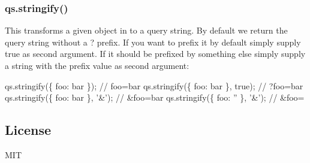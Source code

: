 \subsubsection*{qs.\+stringify()}

This transforms a given object in to a query string. By default we return the query string without a {\ttfamily ?} prefix. If you want to prefix it by default simply supply {\ttfamily true} as second argument. If it should be prefixed by something else simply supply a string with the prefix value as second argument\+:


\begin{DoxyCode}
qs.stringify(\{ foo: bar \});       // foo=bar
qs.stringify(\{ foo: bar \}, true); // ?foo=bar
qs.stringify(\{ foo: bar \}, '&');  // &foo=bar
qs.stringify(\{ foo: '' \}, '&');   // &foo=
\end{DoxyCode}


\subsection*{License}

M\+IT 
